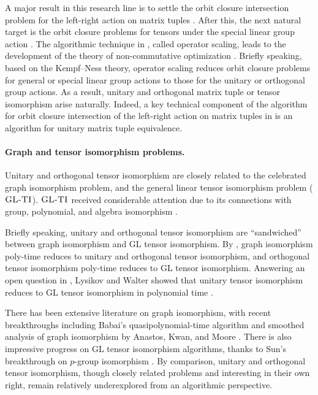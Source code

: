 \documentclass[11pt]{article}
\numberwithin{equation}{section}
\theoremstyle{remark}
\newcommand{\GLTI}{\textsc{GL-TI}}
\begin{document}
A major result in this research line is to settle the orbit closure intersection problem for the left-right action on matrix tuples \cite{GGOW20,IQS18,HH21,AGLOW18,IQ23}. After this, the next natural target is the orbit closure problems for tensors under the special linear group action \cite{burgisser2018efficient,AGLOW18}. The algorithmic technique in \cite{GGOW20,AGLOW18}, called operator scaling, leads to the development of the theory of non-commutative optimization \cite{BFGOWW19}. Briefly speaking, based on the Kempf--Ness theory, operator scaling reduces orbit closure problems for general or special linear group actions to those for the unitary or orthogonal group actions. As a result, unitary and orthogonal matrix tuple or tensor isomorphism arise naturally. Indeed, a key technical component of the algorithm for orbit closure intersection of the left-right action on matrix tuples in \cite{AGLOW18} is an algorithm for unitary matrix tuple equivalence.

\paragraph{Graph and tensor isomorphism problems.} Unitary and orthogonal tensor isomorphism are closely related to the celebrated graph isomorphism problem, and the general linear tensor isomorphism problem ($\GLTI$). $\GLTI$ received considerable attention due to its connections with group, polynomial, and algebra isomorphism \cite{TI1,TI2,TI3,TI4,TI5,JQSY19}.

Briefly speaking, unitary and orthogonal tensor isomorphism are ``sandwiched'' between graph isomorphism and GL tensor isomorphism. By \cite{TI3}, graph isomorphism poly-time reduces to unitary and orthogonal tensor isomorphism, and orthogonal tensor isomorphism poly-time reduces to GL tensor isomorphism. Answering an open question in \cite{TI3}, Lysikov and Walter showed that unitary tensor isomorphism reduces to GL tensor isomorphism in polynomial time \cite{lysikov2024complexity}. 

There has been extensive literature on graph isomorphism, with recent breakthroughs including Babai's quasipolynomial-time algorithm \cite{Bab16} and smoothed analysis of graph isomorphism by Anastos, Kwan, and Moore \cite{anastos2025smoothed}. There is also impressive progress on GL tensor isomorphism algorithms, thanks to Sun's breakthrough on $p$-group isomorphism \cite{Sun23,IMQSZ24}. By comparison, unitary and orthogonal tensor isomorphism, though closely related problems and interesting in their own right, remain relatively underexplored from an algorithmic perspective.
\end{document}
